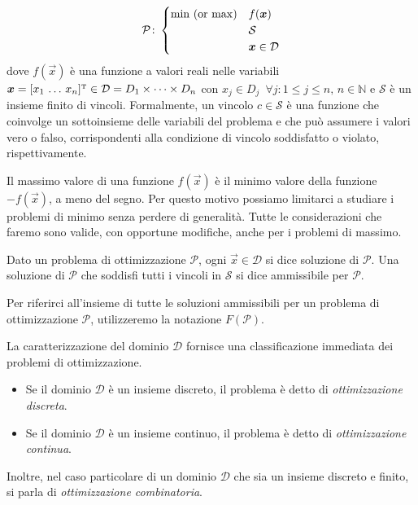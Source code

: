 \begin{equation}
    \mathcal{P}\colon
    \begin{cases}
        \text{$\min$ (or $\max$)} & f(\vec{x}) \\
                                  & \mathcal{S} \\
                                  & \vec{x} \in \mathcal{D}
    \end{cases}\\[10pt]
\end{equation}
dove $f(\vec{x})$ è una funzione a valori reali nelle variabili $\vec{x} =
[x_{1}\, \ldots \, x_{n}]^{\tr} \in \mathcal{D} = D_{1} \times
\cdots \times D_{n}$ con $x_{j} \in D_{j}\,\,\,\forall j\colon 1 \le j
\le n,\, n \in \mathbb{N}$ e $\mathcal{S}$ è un insieme finito di vincoli.
Formalmente, un vincolo $c \in \mathcal{S}$ è una funzione che coinvolge un
sottoinsieme delle variabili del problema e che può assumere i valori vero
o falso, corrispondenti alla condizione di vincolo soddisfatto o violato,
rispettivamente.

Il massimo valore di una funzione $f(\vec{x})$ è il minimo valore della
funzione $-f(\vec{x})$, a meno del segno. Per questo motivo possiamo
limitarci a studiare i problemi di minimo senza perdere di generalità.
Tutte le considerazioni che faremo sono valide, con opportune modifiche,
anche per i problemi di massimo.

\begin{definition}
Dato un problema di ottimizzazione $\mathcal{P}$, ogni $\vec{x} \in
\mathcal{D}$ si dice soluzione di $\mathcal{P}$. Una soluzione di
$\mathcal{P}$ che soddisfi tutti i vincoli in $\mathcal{S}$ si dice
ammissibile per $\mathcal{P}$.
\end{definition}
Per riferirci all'insieme di tutte le soluzioni ammissibili per un problema
di ottimizzazione $\mathcal{P}$, utilizzeremo la notazione
$F(\mathcal{P})$.

La caratterizzazione del dominio $\mathcal{D}$ fornisce una
classificazione immediata dei problemi di ottimizzazione.

\begin{itemize}
    \item Se il dominio $\mathcal{D}$ è un insieme discreto, il problema è
        detto di \textit{ottimizzazione discreta}.
    \item Se il dominio $\mathcal{D}$ è un insieme continuo, il problema è
        detto di \textit{ottimizzazione continua}.
\end{itemize}
Inoltre, nel caso particolare di un dominio $\mathcal{D}$ che sia un
insieme discreto e finito, si parla di \textit{ottimizzazione
combinatoria}.

